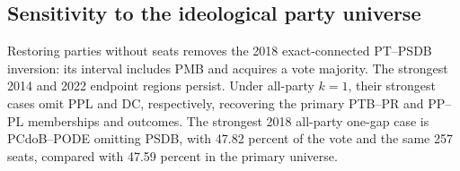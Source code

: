 \documentclass[11pt]{article}
\begin{document}

\newpage
\subsection{Sensitivity to the ideological party universe}
\label{app:ideological-universes}

Restoring parties without seats removes the 2018 exact-connected PT--PSDB
inversion: its interval includes PMB and acquires a vote majority. The strongest
2014 and 2022 endpoint regions persist. Under all-party \(k=1\), their strongest
cases omit PPL and DC, respectively, recovering the primary PTB--PR and PP--PL
memberships and outcomes. The strongest 2018 all-party one-gap case is
PCdoB--PODE omitting PSDB, with 47.82 percent of the vote and the same 257 seats,
compared with 47.59 percent in the primary universe.
\end{document}
